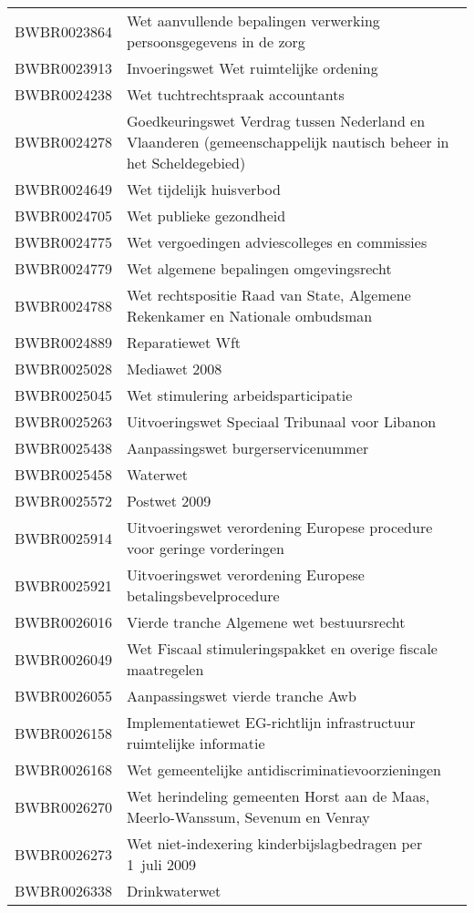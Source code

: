 \begin{longtable}{lp{}}
BWBR0023864 & Wet aanvullende bepalingen verwerking persoonsgegevens in de zorg \\
BWBR0023913 & Invoeringswet Wet ruimtelijke ordening \\
BWBR0024238 & Wet tuchtrechtspraak accountants \\
BWBR0024278 & Goedkeuringswet Verdrag tussen Nederland en Vlaanderen (gemeenschappelijk nautisch beheer in het Scheldegebied) \\
BWBR0024649 & Wet tijdelijk huisverbod  \\
BWBR0024705 & Wet publieke gezondheid \\
BWBR0024775 & Wet vergoedingen adviescolleges en commissies  \\
BWBR0024779 & Wet algemene bepalingen omgevingsrecht \\
BWBR0024788 & Wet rechtspositie Raad van State, Algemene Rekenkamer en Nationale ombudsman \\
BWBR0024889 & Reparatiewet Wft \\
BWBR0025028 & Mediawet 2008 \\
BWBR0025045 & Wet stimulering arbeidsparticipatie \\
BWBR0025263 & Uitvoeringswet Speciaal Tribunaal voor Libanon  \\
BWBR0025438 & Aanpassingswet burgerservicenummer \\
BWBR0025458 & Waterwet \\
BWBR0025572 & Postwet 2009 \\
BWBR0025914 & Uitvoeringswet verordening Europese procedure voor geringe vorderingen \\
BWBR0025921 & Uitvoeringswet verordening Europese betalingsbevelprocedure \\
BWBR0026016 & Vierde tranche Algemene wet bestuursrecht \\
BWBR0026049 & Wet Fiscaal stimuleringspakket en overige fiscale maatregelen \\
BWBR0026055 & Aanpassingswet vierde tranche Awb \\
BWBR0026158 & Implementatiewet EG-richtlijn infrastructuur ruimtelijke informatie \\
BWBR0026168 & Wet gemeentelijke antidiscriminatievoorzieningen  \\
BWBR0026270 & Wet herindeling gemeenten Horst aan de Maas, Meerlo-Wanssum, Sevenum en Venray \\
BWBR0026273 & Wet niet-indexering kinderbijslagbedragen per 1 juli 2009 \\
BWBR0026338 & Drinkwaterwet  \\

\end{longtable}
